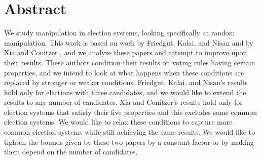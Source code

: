 
\chapter*{Abstract}

We study manipulation in election systems, looking specifically at random manipulation. This work is based on work by Friedgut, Kalai, and Nisan \cite{friedgut2008elections} and by Xia and Conitzer \cite{xia2008sufficient}, and we analyze these papers and attempt to improve upon their results. These authors condition their results on voting rules having certain properties, and we intend to look at what happens when these conditions are replaced by stronger or weaker conditions. Friedgut, Kalai, and Nisan's results hold only for elections with three candidates, and we would like to extend the results to any number of candidates. Xia and Conitzer's results hold only for election systems that satisfy their five properties and this excludes some common election systems. We would like to relax these conditions to capture more common election systems while still achieving the same results. We would like to tighten the bounds given by these two papers by a constant factor or by making them depend on the number of candidates.
